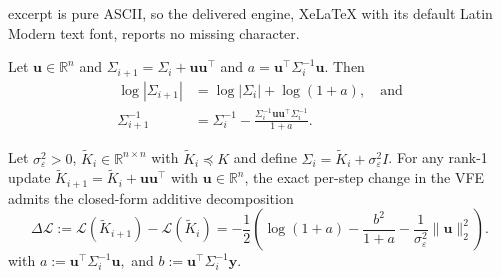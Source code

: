 \documentclass[10pt,a4paper]{amsart}
\newcommand{\R}{\mathbb{R}}
\begin{document}
excerpt is pure ASCII, so the delivered engine, XeLaTeX with its default Latin Modern text font, reports no missing character.
\begin{lemma}
\label{lem:rank1-updates}
Let $\bm{u}\in\R^{n}$ and $\Sigma_{i+1}=\Sigma_i+\bm{u}\bm{u}^\top$ and $a = \bm{u}^\top \Sigma_i^{-1} \bm{u}.$ Then
\begin{align*}
    \log|\Sigma_{i+1}| &= \log|\Sigma_i| + \log(1+a), \quad \text{and}\\
    \Sigma_{i+1}^{-1}
    &= \Sigma_i^{-1}
    - \frac{\Sigma_i^{-1}\bm{u} \bm{u}^\top \Sigma_i^{-1}}{1+a}.
\end{align*}
\end{lemma}

\begin{theorem}
\label{thm:per-pivot-gain}
Let $\sigma_\varepsilon^2>0$, $\widetilde{K}_i \in \R^{n\times n}$ with $\widetilde{K}_i\preceq K$ and define $\Sigma_i = \widetilde{K}_i + \sigma_\varepsilon^2I$.
For any rank-1 update $\widetilde K_{i+1}=\widetilde K_i+\bm{u} \bm{u}^\top$ with $\bm{u}\in\R^n$, the exact per-step change in the VFE admits the closed-form additive decomposition 
\begin{equation}
    \Delta \mathcal L
    :=
    \mathcal L(\widetilde K_{i+1})-\mathcal L(\widetilde K_i)
    =
    -\frac{1}{2}\left(
    \log(1+a)
    -\frac{b^2}{1+a}
    -\frac{1}{\sigma_\varepsilon^2}\|\bm{u}\|_2^2
    \right).
    \label{eq:deltaVFE}
\end{equation}
with $a := \bm{u}^\top \Sigma_i^{-1} \bm{u},$ and $b := \bm{u}^\top \Sigma_i^{-1} \bm y.$
\end{theorem}
\end{document}
